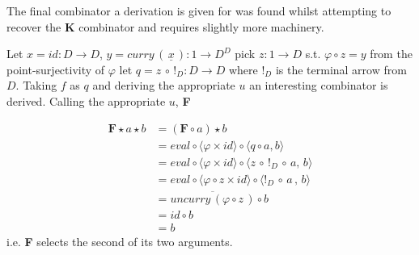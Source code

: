 The final combinator a derivation is given for was found whilst attempting to
recover the \textbf{K} combinator and requires slightly more machinery.

Let $x = id : D \rightarrow D$, $y = curry \, ( \, \underline{x} \, ) : 1
\rightarrow D^D$ pick $z : 1 \rightarrow D$ s.t. $\varphi \circ z = y$ from the
point-surjectivity of $\varphi$ let $q = z \, \circ \, !_{D} : D \rightarrow D$
where $!_{D}$ is the terminal arrow from $D$. Taking $f$ as $q$ and deriving the
appropriate $u$ an interesting combinator is derived. Calling the appropriate
$u$, \textbf{F}

\begin{align*}
    \textbf{F} \star a \star b &= (\textbf{F} \circ a) \star b \\
    &= eval \circ \langle \varphi  \times id \rangle \circ \langle q \circ a , b
    \rangle \\
    &= eval \circ \langle \varphi \times id \rangle \circ \langle z \, \circ \, !_{D}
    \, \circ \, a , \, b \rangle \\
    &= eval \circ \langle \varphi \circ z \times id \rangle \circ \langle !_{D} \,
    \circ \, a \, , \, b \rangle \\
    &= \overline{uncurry \, ( \varphi \circ z \, )} \circ b \\
    &= id \circ b \\
    &= b
\end{align*}
i.e. \textbf{F} selects the second of its two arguments.
